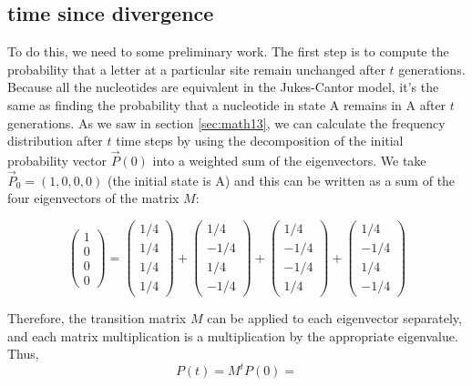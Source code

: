 \documentclass[
  letterpaper,
  DIV=11,
  numbers=noendperiod]{scrreprt}
\begin{document}
\hypertarget{time-since-divergence}{%
\subsection{time since divergence}\label{time-since-divergence}}

To do this, we need to some preliminary work. The first step is to
compute the probability that a letter at a particular site remain
unchanged after \(t\) generations. Because all the nucleotides are
equivalent in the Jukes-Cantor model, it's the same as finding the
probability that a nucleotide in state A remains in A after \(t\)
generations. As we saw in section \ref{sec:math13}, we can calculate the
frequency distribution after \(t\) time steps by using the decomposition
of the initial probability vector \(\vec P(0)\) into a weighted sum of
the eigenvectors. We take \(\vec P_0 = (1,0,0,0)\) (the initial state is
A) and this can be written as a sum of the four eigenvectors of the
matrix \(M\):

\[ \left(\begin{array}{c} 1 \\ 0 \\ 0 \\ 0 \end{array}\right) = \left(\begin{array}{c} 1/4 \\ 1/4 \\ 1/4 \\ 1/4 \end{array}\right) + \left(\begin{array}{c} 1/4 \\ -1/4 \\ 1/4 \\ -1/4 \end{array}\right) +  \left(\begin{array}{c} 1/4 \\ -1/4 \\ -1/4 \\ 1/4 \end{array}\right) + \left(\begin{array}{c} 1/4 \\ -1/4 \\ 1/4 \\ -1/4 \end{array}\right) \]

Therefore, the transition matrix \(M\) can be applied to each
eigenvector separately, and each matrix multiplication is a
multiplication by the appropriate eigenvalue. Thus,
\[ P(t) = M^t P(0) =  \]
\end{document}

